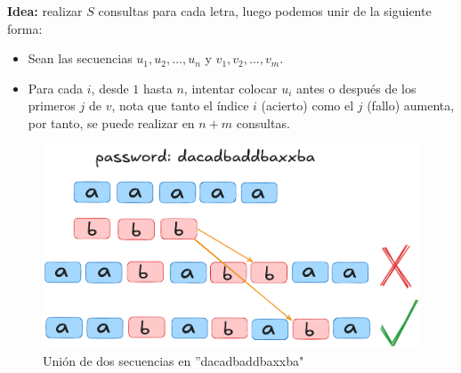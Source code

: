 \documentclass[12pt]{beamer}
\begin{document}
\begin{frame}
\begin{bloque}

\textbf{Idea:} realizar $S$ consultas para cada letra, luego podemos unir de la siguiente forma:

\begin{itemize}
    \item Sean las secuencias $u_1, u_2, \dots, u_n$ y $v_1, v_2, ..., v_m$.
    \item Para cada $i$, desde $1$ hasta $n$, intentar colocar $u_i$ antes o después de los primeros $j$ de $v$, nota
    que tanto el índice $i$ (acierto) como el $j$ (fallo) aumenta, por tanto, se puede realizar en $n + m$ consultas.
\end{itemize}

\end{bloque}
\end{frame}

\begin{frame}
\begin{bloque}

\begin{figure}
    \centering
    \includegraphics[width=0.8\linewidth]{img/select.png}
    \caption{Unión de dos secuencias en ''dacadbaddbaxxba"}
    \label{fig:enter-label}
\end{figure}

\end{bloque}
\end{frame}
\end{document}
